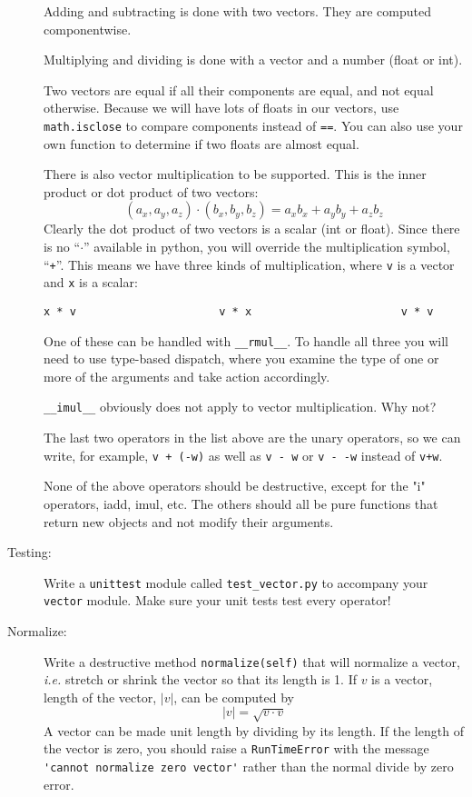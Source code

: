 \documentclass[12pt]{article}
\begin{document}
\begin{description}
Adding and subtracting is done with two vectors.
They are computed componentwise.

Multiplying and dividing is done with a vector
and a number (float or int).

Two vectors are equal
if all their components are equal, and not
equal otherwise.  Because we will have
lots of floats in our vectors, use \lstinline{math.isclose}
to compare components instead of \lstinline{==}.
You can also use your own function to 
determine if two floats are almost equal.

There is also vector multiplication to be supported.
This is the inner product or dot product
of two vectors:
\[
(a_x, a_y, a_z) \cdot (b_x, b_y, b_z) = a_xb_x + a_yb_y + a_zb_z
\]
Clearly the dot product of two vectors is a scalar
(int or float).  Since there is no ``$\cdot$'' available
in python, you will override the multiplication
symbol, ``{\tt +}''.  This means we have three kinds
of multiplication, where {\tt v} is a vector and {\tt x}
is a scalar:
\begin{lstlisting}
x * v                      v * x                       v * v
\end{lstlisting}
One of these can be handled with \lstinline{__rmul__}.
To handle all three you will need to use type-based
dispatch, where you examine the type of one or more
of the arguments and take action accordingly.

\lstinline{__imul__} obviously does not apply
to vector multiplication.  Why not?

The last two operators in the list above
are the unary operators, so we can write,
for example, \lstinline{v + (-w)} as well as \lstinline{v - w}
or \lstinline{v - -w} instead of \lstinline{v+w}.

None of the above operators should be destructive,
except for the "i" operators, iadd, imul, etc.
The others should all be pure functions
that return new objects and not modify
their arguments.

\item[Testing:]  Write a \lstinline{unittest}
module called \lstinline{test_vector.py}
to accompany your \lstinline{vector}
module.  Make sure your unit tests test every operator!

\item[Normalize:]  Write a destructive method
\lstinline{normalize(self)}
that will normalize a vector, {\em i.e.} stretch
or shrink the vector so that its length is 1.
If $v$ is a vector, length of 
the  vector, $|v|$, can be computed by
\[
|v| = \sqrt{v\cdot v}
\]
A vector can be made unit length by dividing by its
length.  If the length of the vector is zero,
you should raise a \lstinline{RunTimeError}
with the message \lstinline{'cannot normalize zero vector'}
rather than the normal divide by zero error.


\end{description}
\end{document}
